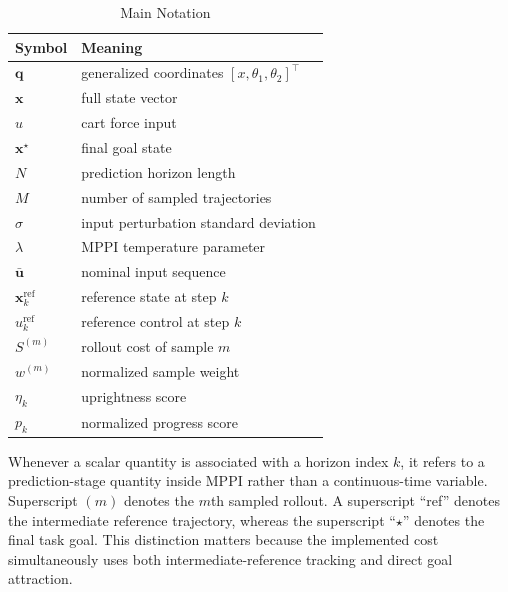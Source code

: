 \documentclass[conference]{IEEEtran}
\begin{document}
\begin{table}[t]
\caption{Main Notation}
\label{tab:notation}
\centering
\begin{tabular}{l l}
\toprule
Symbol & Meaning \\
\midrule
$\bm{q}$ & generalized coordinates $[x,\theta_1,\theta_2]^\top$ \\
$\bm{x}$ & full state vector \\
$u$ & cart force input \\
$\bm{x}^\star$ & final goal state \\
$N$ & prediction horizon length \\
$M$ & number of sampled trajectories \\
$\sigma$ & input perturbation standard deviation \\
$\lambda$ & MPPI temperature parameter \\
$\bar{\bm{u}}$ & nominal input sequence \\
$\bm{x}_k^{\mathrm{ref}}$ & reference state at step $k$ \\
$u_k^{\mathrm{ref}}$ & reference control at step $k$ \\
$S^{(m)}$ & rollout cost of sample $m$ \\
$w^{(m)}$ & normalized sample weight \\
$\eta_k$ & uprightness score \\
$p_k$ & normalized progress score \\
\bottomrule
\end{tabular}
\end{table}

Whenever a scalar quantity is associated with a horizon index $k$, it refers to a prediction-stage quantity inside MPPI rather than a continuous-time variable. Superscript $(m)$ denotes the $m$th sampled rollout. A superscript ``ref'' denotes the intermediate reference trajectory, whereas the superscript ``$\star$'' denotes the final task goal. This distinction matters because the implemented cost simultaneously uses both intermediate-reference tracking and direct goal attraction.
\end{document}
